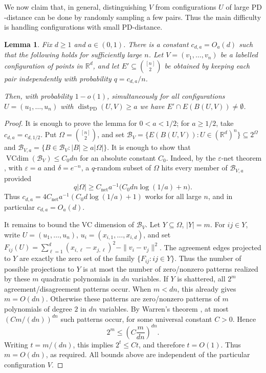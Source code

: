 \documentclass[fullpage,11pt]{article}
\newcommand{\R}{\mathbb{R}}
\newcommand{\PD}{\mathrm{PD}}
\providecommand{\dist}{\operatorname{dist}}
\theoremstyle{break}
\newtheorem{lemma}[theorem]{Lemma}
\theoremstyle{definition}
\theoremstyle{break}
\begin{document}
We now claim that, in general, distinguishing \(V\) from configurations
\(U\) of large \(\PD\)-distance can be done by randomly sampling a few pairs.
Thus the main difficulty is handling configurations with small
\(\PD\)-distance.

\begin{lemma}
\label{lem:sampling-separates-PD}
Fix $d\ge 1$ and $a\in(0,1)$. There is a constant \(c_{d,a}=O_a(d)\) such that the
following holds for sufficiently large \(n\). Let
\(V=(v_1,\ldots,v_n)\) be a labelled configuration of points in $\mathbb{R}^d$, and let
\(E'\subseteq \binom{[n]}2\) be obtained by keeping each pair independently
with probability \(q=c_{d,a}/n\).

Then, with probability \(1-o(1)\),
simultaneously for all configurations \(U=(u_1,\ldots,u_n)\) with
\(\dist_{\PD}(U,V)\ge a\) we have \(E'\cap E(B(U,V))\neq\emptyset\).
\end{lemma}

\begin{proof}
It is enough to prove the lemma for \(0<a<1/2\); for \(a\ge1/2\), take
\(c_{d,a}=c_{d,1/2}\).
Put \(\Omega=\binom{[n]}2\), and set
\(\mathcal B_V=\{E(B(U,V)):U\in(\R^d)^n\}\subseteq2^\Omega\) and
\(\mathcal B_{V,a}=\{B\in\mathcal B_V:|B|\ge a|\Omega|\}\). It is enough to
show that \(\operatorname{VCdim}(\mathcal B_V)\le C_0dn\) for an absolute
constant \(C_0\). Indeed, by the \(\varepsilon\)-net theorem
\cite[Theorem~6.10]{zbMATH07478425}, with \(\varepsilon=a\) and
\(\delta=e^{-n}\), a \(q\)-random subset of \(\Omega\) hits every member of
\(\mathcal B_{V,a}\) provided
\[
        q|\Omega|
        \ge
        C_{\mathrm{net}}a^{-1}\bigl(C_0dn\log(1/a)+n\bigr).
\]
Thus \(c_{d,a}=4C_{\mathrm{net}}a^{-1}(C_0d\log(1/a)+1)\) works for all large
\(n\), and in particular \(c_{d,a}=O_a(d)\).

It remains to bound the VC dimension of \(\mathcal{B}_V\). Let \(Y\subseteq\Omega\), \(|Y|=m\).
For \(ij\in Y\), write \(U=(u_1,\ldots,u_n)\),
\(u_i=(x_{i,1},\ldots,x_{i,d})\), and set
\(F_{ij}(U)=\sum_{\ell=1}^d (x_{i,\ell}-x_{j,\ell})^2-\|v_i-v_j\|^2\). The
agreement edges projected to \(Y\) are exactly the zero set of the family
\(\{F_{ij}:ij\in Y\}\). Thus the number of possible projections to \(Y\) is
at most the number of zero/nonzero patterns realized by these \(m\) quadratic
polynomials in \(dn\) variables. If \(Y\) is shattered, all \(2^m\)
agreement/disagreement patterns occur. When \(m<dn\), this already gives
\(m=O(dn)\). Otherwise these patterns are zero/nonzero patterns of \(m\)
polynomials of degree \(2\) in \(dn\) variables. By Warren's theorem
\cite[Theorem~10.4]{zbMATH06484571}, at most
\(\left(Cm/(dn)\right)^{dn}\) such patterns occur, for some universal
constant \(C>0\). Hence
\[
        2^m\le \left(C\frac{m}{dn}\right)^{dn}.
\]
Writing \(t=m/(dn)\), this implies \(2^t\le Ct\), and therefore \(t=O(1)\).
Thus \(m=O(dn)\), as required. All bounds above are independent of the
particular configuration \(V\).
\end{proof}
\end{document}
